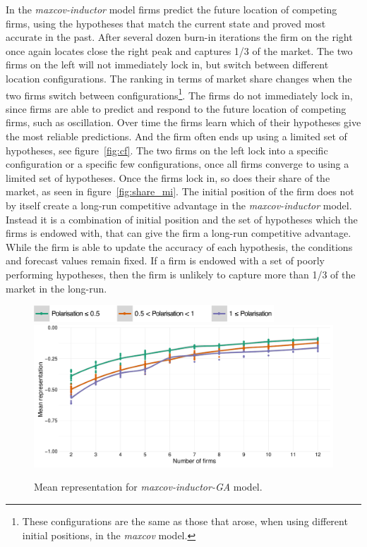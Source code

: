 \documentclass[preprint, 12pt]{elsarticle}
\begin{document}
In the \emph{maxcov-inductor} model firms predict the future location of competing firms, using the hypotheses that match the current state and proved most accurate in the past. After several dozen burn-in iterations the firm on the right once again locates close the right peak and captures 1/3 of the market. The two firms on the left will not immediately lock in, but switch between different location configurations. The ranking in terms of market share changes when the two firms switch between configurations\footnote{These configurations are the same as those that arose, when using different initial positions, in the \emph{maxcov} model.}. The firms do not immediately lock in, since firms are able to predict and respond to the future location of competing firms, such as oscillation. Over time the firms learn which of their hypotheses give the most reliable predictions. And the firm often ends up using a limited set of hypotheses, see figure~\ref{fig:cf}. The two firms on the left lock into a specific configuration or a specific few configurations, once all firms converge to using a limited set of hypotheses. Once the firms lock in, so does their share of the market, as seen in figure~\ref{fig:share_mi}. The initial position of the firm does not by itself create a long-run competitive advantage in the \emph{maxcov-inductor} model. Instead it is a combination of initial position and the set of hypotheses which the firms is endowed with, that can give the firm a long-run competitive advantage. While the firm is able to update the accuracy of each hypothesis, the conditions and forecast values remain fixed. If a firm is endowed with a set of poorly performing hypotheses, then the firm is unlikely to capture more than 1/3 of the market in the long-run. 

\begin{figure}[ht!]
	\centering
	\includegraphics[width=90mm]{Graphics/legend_pol.pdf}
	\includegraphics[width=1\textwidth]{Graphics/fig623a.pdf}
	\caption{Mean representation for \emph{maxcov-inductor-GA} model.}
	\label{fig:representation_miga}
\end{figure}
\end{document}
